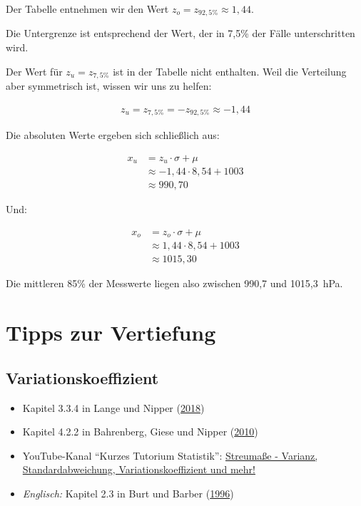 \documentclass[
  11pt,
  ngerman,
  a4paper,
]{report}
\providecommand{\tightlist}{%
  \setlength{\itemsep}{0pt}\setlength{\parskip}{0pt}}
\begin{document}
Der Tabelle entnehmen wir den Wert \(z_o=z_{92,5\%}\approx1{,}44\).

Die Untergrenze ist entsprechend der Wert, der in 7,5\% der Fälle unterschritten wird.

Der Wert für \(z_u=z_{7{,}5\%}\) ist in der Tabelle nicht enthalten. Weil die Verteilung aber symmetrisch ist, wissen wir uns zu helfen:

\[
  \begin{aligned}
    z_u=z_{7{,}5\%}=-z_{92{,}5\%}\approx-1{,}44
  \end{aligned}
  \]

Die absoluten Werte ergeben sich schließlich aus:

\[
  \begin{aligned}
    x_u&=z_u\cdot \sigma + \mu \\
    &\approx-1{,}44 \cdot 8{,}54 + 1003\\
    &\approx990{,}70
  \end{aligned}
\]

Und:

\[
  \begin{aligned}
    x_o&=z_o\cdot \sigma + \mu  \\
    &\approx1{,}44 \cdot 8{,}54 + 1003\\
    & \approx 1015{,}30
  \end{aligned}
\]

Die mittleren 85\% der Messwerte liegen also zwischen 990,7 und 1015,3~hPa.

\hypertarget{tipps-zur-vertiefung-2}{%
\section*{Tipps zur Vertiefung}\label{tipps-zur-vertiefung-2}}

\hypertarget{variationskoeffizient-1}{%
\subsection{Variationskoeffizient}\label{variationskoeffizient-1}}

\begin{itemize}
\tightlist
\item
  Kapitel 3.3.4 in Lange und Nipper (\protect\hyperlink{ref-delange}{2018})
\item
  Kapitel 4.2.2 in Bahrenberg, Giese und Nipper (\protect\hyperlink{ref-bahrenberg}{2010})
\item
  YouTube-Kanal \enquote{Kurzes Tutorium Statistik}: \href{https://www.youtube.com/watch?v=3oZrS3ZWVcA}{Streumaße - Varianz, Standardabweichung, Variationskoeffizient und mehr!}
\item
  \emph{Englisch:} Kapitel 2.3 in Burt und Barber (\protect\hyperlink{ref-burt}{1996})
\end{itemize}
\end{document}
